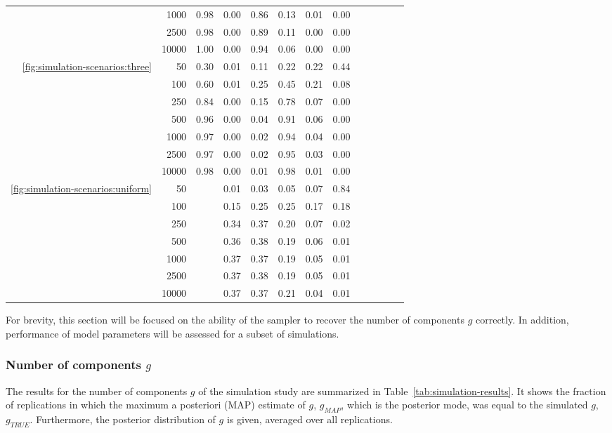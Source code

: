\begin{table}[ht]
\begin{tabular}{rrcrrrrrrrrrr}
		& 1000 & 0.98 & 0.00 & 0.86 & 0.13 & 0.01 & 0.00 \\ 
		& 2500 & 0.98 & 0.00 & 0.89 & 0.11 & 0.00 & 0.00 \\ 
		& 10000 & 1.00 & 0.00 & 0.94 & 0.06 & 0.00 & 0.00 \\ 
		\hline
		\ref{fig:simulation-scenarios:three} & 50 & 0.30 & 0.01 & 0.11 & 0.22 & 0.22 & 0.44 \\ 
		& 100 & 0.60 & 0.01 & 0.25 & 0.45 & 0.21 & 0.08 \\ 
		& 250 & 0.84 & 0.00 & 0.15 & 0.78 & 0.07 & 0.00 \\ 
		& 500 & 0.96 & 0.00 & 0.04 & 0.91 & 0.06 & 0.00 \\ 
		& 1000 & 0.97 & 0.00 & 0.02 & 0.94 & 0.04 & 0.00 \\ 
		& 2500 & 0.97 & 0.00 & 0.02 & 0.95 & 0.03 & 0.00 \\ 
		& 10000 & 0.98 & 0.00 & 0.01 & 0.98 & 0.01 & 0.00 \\
		\hline
		\ref{fig:simulation-scenarios:uniform} & 50 & & 0.01 & 0.03 & 0.05 & 0.07 & 0.84 \\ 
		& 100 &  & 0.15 & 0.25 & 0.25 & 0.17 & 0.18 \\ 
		& 250 &  & 0.34 & 0.37 & 0.20 & 0.07 & 0.02 \\ 
		& 500 &  & 0.36 & 0.38 & 0.19 & 0.06 & 0.01 \\ 
		& 1000 &  & 0.37 & 0.37 & 0.19 & 0.05 & 0.01 \\ 
		& 2500 &  & 0.37 & 0.38 & 0.19 & 0.05 & 0.01 \\ 
		& 10000 &  & 0.37 & 0.37 & 0.21 & 0.04 & 0.01 \\ 
		\hline
	\end{tabular}
\end{table}

For brevity, this section will be focused on the ability of the sampler to recover the number of components $g$ correctly. In addition, performance of model parameters will be assessed for a subset of simulations.

\subsubsection{Number of components $g$} 

The results for the number of components $g$ of the simulation study are summarized in Table~\ref{tab:simulation-results}. It shows the fraction of replications in which the maximum a posteriori (MAP) estimate of $g$, $g_{MAP}$, which is the posterior mode, was equal to the simulated $g$, $g_{TRUE}$. Furthermore, the posterior distribution of $g$ is given, averaged over all replications. 


